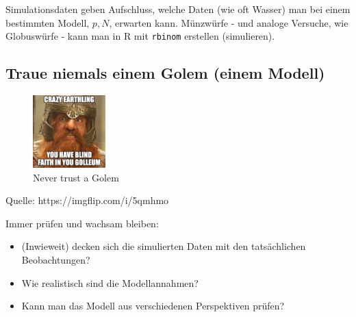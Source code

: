 \documentclass[
  a4paper,
  DIV=11]{scrreprt}
\providecommand{\tightlist}{%
  \setlength{\itemsep}{0pt}\setlength{\parskip}{0pt}}\usepackage{longtable,booktabs,array}
\theoremstyle{definition}
\theoremstyle{remark}
\begin{document}
\begin{tcolorbox}[enhanced jigsaw, title=\textcolor{quarto-callout-important-color}{\faExclamation}\hspace{0.5em}{Wichtig}, bottomtitle=1mm, bottomrule=.15mm, titlerule=0mm, colbacktitle=quarto-callout-important-color!10!white, colframe=quarto-callout-important-color-frame, leftrule=.75mm, left=2mm, toprule=.15mm, colback=white, arc=.35mm, breakable, toptitle=1mm, opacityback=0, rightrule=.15mm, coltitle=black, opacitybacktitle=0.6]

Simulationsdaten geben Aufschluss, welche Daten (wie oft Wasser) man bei
einem bestimmten Modell, \(p,N\), erwarten kann. Münzwürfe - und analoge
Versuche, wie Globuswürfe - kann man in R mit \texttt{rbinom} erstellen
(simulieren).

\end{tcolorbox}

\hypertarget{traue-niemals-einem-golem-einem-modell}{%
\subsection{Traue niemals einem Golem (einem
Modell)}\label{traue-niemals-einem-golem-einem-modell}}

\begin{figure}

{\centering \includegraphics[width=0.25\textwidth,height=\textheight]{./img/5qmhmo.jpg}

}

\caption{Never trust a Golem}

\end{figure}

Quelle: https://imgflip.com/i/5qmhmo

Immer prüfen und wachsam bleiben:

\begin{itemize}
\tightlist
\item
  (Inwieweit) decken sich die simulierten Daten mit den tatsächlichen
  Beobachtungen?
\item
  Wie realistisch sind die Modellannahmen?
\item
  Kann man das Modell aus verschiedenen Perspektiven prüfen?
\end{itemize}
\end{document}
